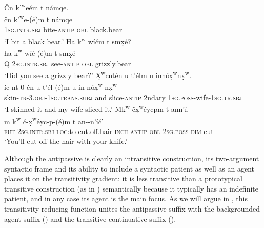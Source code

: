 \documentclass[output=paper,colorlinks,citecolor=brown]{langscibook}
\begin{document}
\ea 
\label{ex-thomason-14}
\v{C}n {k'\textsuperscript w}e\textglotstop\'em t n\textltilde\'amqe. \\
\gll \v{c}n {k'\textsuperscript w}e{\textglotstop}-(\'e)m t
n\textltilde\'amqe\\
\textsc{1sg}.\textsc{intr.sbj} bite-\textsc{antip} \textsc{obl}  black.bear \\
\glt `I bit a  black bear.'
\ex 
\label{ex-thomason-15}
Ha {k\textsuperscript w} w\'i\v{c}m t sm\d{x}\'e? \\
\gll ha k\textsuperscript w w\'i\v{c}-(\'e)m t sm\d{x}\'e\\ 
Q \textsc{2sg}.\textsc{intr.sbj} see-\textsc{antip} \textsc{obl} grizzly.bear\\
\glt `Did you see a grizzly bear?'
\ex
\label{ex-thomason-16}
{\d{X}\textsuperscript w}cnt\'en u t'\'elm {\textltilde}u inn\'o{\d{x}\textsuperscript w}n{\d{x}\textsuperscript w}.  \\
\'ic-nt-0-\'en u t'\'el-(\'e)m
{\textltilde}u in-n\'o{\d{x}\textsuperscript w}-n{\d{x}\textsuperscript w} \\
skin-\textsc{tr}-3.\textsc{obj}-1\textsc{sg}.\textsc{trans}.\textsc{subj} and slice-\textsc{antip} 2ndary \textsc{1sg}.\textsc{poss}-wife-\textsc{1sg}.\textsc{tr.sbj} \\
\glt `I skinned it and my wife sliced it.'
\ex 
\label{ex-thomason-17}
Mk\textsuperscript w \v{c}\d{x}\textsuperscript w\'eycpm t an{\textltilde}n'\'i. \\
 \gll m k{\textsuperscript w} \v{c}-\d{x}{\textsuperscript w}\'eyc-p-(\'e)m t
an-\textltilde-n'\'i\v{c}'\\ 
\textsc{fut} \textsc{2sg}.\textsc{intr.sbj} \textsc{loc:}to-cut.off.hair-\textsc{inch}-\textsc{antip} \textsc{obl} \textsc{2sg}.\textsc{poss}-\textsc{dim}-cut\\
 \glt `You'll cut off the hair with your knife.'
 \z


Although the antipassive is clearly an intransitive construction, its
two-ar\-gu\-ment syntactic frame and its ability to include a syntactic
patient as well as an agent places it on the transitivity gradient: it
is less transitive than a prototypical transitive construction (as in
) semantically because it typically has an indefinite patient,
and in any case its agent is the main focus.  As we will argue in , this transitivity-reducing function unites the antipassive suffix
with the backgrounded agent suffix () and the transitive
continuative suffix ().
\end{document}
